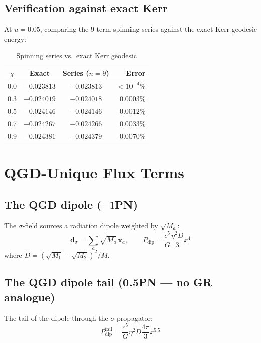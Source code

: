 \documentclass[11pt,a4paper]{article}
\theoremstyle{plain}
\theoremstyle{definition}
\theoremstyle{remark}
\newcommand{\boldx}{\mathbf{x}}
\begin{document}
\subsection{Verification against exact Kerr}

At $u = 0.05$, comparing the 9-term spinning series against the exact Kerr geodesic energy:

\begin{table}[h]
  \centering
  \caption{Spinning series vs.\ exact Kerr geodesic}
  \begin{tabular}{@{}cccr@{}}
    \toprule
    $\chi$ & Exact & Series ($n=9$) & Error \\
    \midrule
    0.0 & $-0.023813$ & $-0.023813$ & $< 10^{-4}\%$ \\
    0.3 & $-0.024019$ & $-0.024018$ & $0.0003\%$ \\
    0.5 & $-0.024146$ & $-0.024146$ & $0.0012\%$ \\
    0.7 & $-0.024267$ & $-0.024266$ & $0.0033\%$ \\
    0.9 & $-0.024381$ & $-0.024379$ & $0.0070\%$ \\
    \bottomrule
  \end{tabular}
\end{table}

\section{QGD-Unique Flux Terms}
\label{sec:qgd_flux}

\subsection{The QGD dipole ($-1$PN)}

The $\sigma$-field sources a radiation dipole weighted by $\sqrt{M_a}$:
\begin{equation}
  \boldsymbol{d}_\sigma = \sum_a\sqrt{M_a}\,\boldx_a, \qquad P_{\mathrm{dip}} = \frac{c^5}{G}\frac{\eta^2 D}{3}x^4
\end{equation}
where $D = (\sqrt{M_1} - \sqrt{M_2})^2/M$.

\subsection{The QGD dipole tail (0.5PN --- no GR analogue)}

The tail of the dipole through the $\sigma$-propagator:
\begin{equation}
  P_{\mathrm{dip}}^{\mathrm{tail}} = \frac{c^5}{G}\eta^2 D\frac{4\pi}{3}x^{5.5}
\end{equation}
\end{document}

